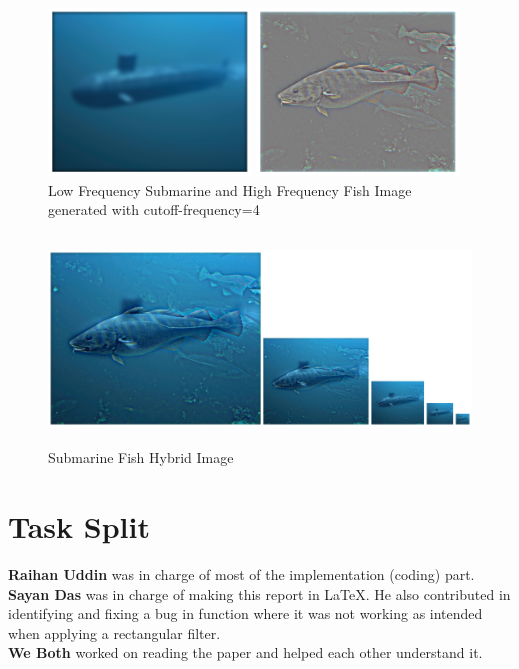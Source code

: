 \documentclass[12pt]{report}
\begin{document}
\begin{figure}[H]
    \centering
    \begin{minipage}{0.45\textwidth}
            \centering
            \includegraphics[height=12em]{./images/submarine_low.png}
        \end{minipage}
        \begin{minipage}{0.45\textwidth}
            \centering
            \includegraphics[height=12em]{./images/fish_high.png}
        \end{minipage}
        \caption{Low Frequency Submarine and High Frequency Fish Image generated with cutoff-frequency=4}
        \label{submarine_fish_low_high}
\end{figure}
\begin{figure}[H]
    \centering
        \includegraphics[height=15em]{./images/submarine_fish_hybrid.png}
        \caption{Submarine Fish Hybrid Image}
        \label{submarine_fish_hybrid}
\end{figure}

\chapter{Task Split}
\textbf{Raihan Uddin} was in charge of most of the implementation (coding) part. \\
\textbf{Sayan Das} was in charge of making this report in \LaTeX. He also contributed in identifying and fixing a bug in  function where it was not working as intended when applying a rectangular filter. \\
\textbf{We Both} worked on reading the paper \cite{oliva2006} and helped each other understand it.
\end{document}
